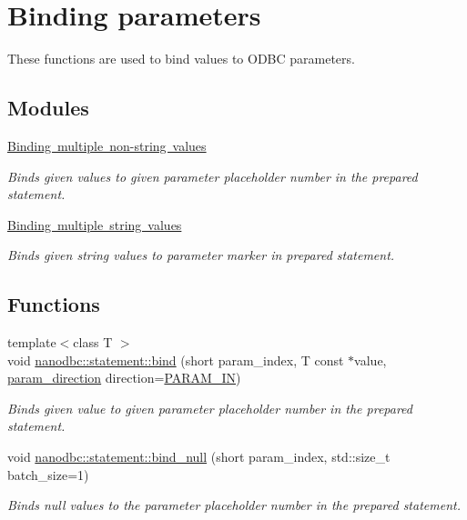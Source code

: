 \hypertarget{group__binding}{}\section{Binding parameters}
\label{group__binding}


These functions are used to bind values to O\+D\+BC parameters.  


\subsection*{Modules}
\begin{DoxyCompactItemize}
\item 
\mbox{\hyperlink{group__bind__multi}{Binding multiple non-\/string values}}
\begin{DoxyCompactList}\small\item\em Binds given values to given parameter placeholder number in the prepared statement. \end{DoxyCompactList}\item 
\mbox{\hyperlink{group__bind__strings}{Binding multiple string values}}
\begin{DoxyCompactList}\small\item\em Binds given string values to parameter marker in prepared statement. \end{DoxyCompactList}\end{DoxyCompactItemize}
\subsection*{Functions}
\begin{DoxyCompactItemize}
\item 
{\footnotesize template$<$class T $>$ }\\void \mbox{\hyperlink{group__binding_gabe1b3e2f93e5b854f6f6a3dfa3250f5c}{nanodbc\+::statement\+::bind}} (short param\+\_\+index, T const $\ast$value, \mbox{\hyperlink{classnanodbc_1_1statement_a523142f53cbbee8d68a074da993e7fa6}{param\+\_\+direction}} direction=\mbox{\hyperlink{classnanodbc_1_1statement_a523142f53cbbee8d68a074da993e7fa6ae33f42ce0677d00c291ff4d8e39f99de}{P\+A\+R\+A\+M\+\_\+\+IN}})
\begin{DoxyCompactList}\small\item\em Binds given value to given parameter placeholder number in the prepared statement. \end{DoxyCompactList}\item 
void \mbox{\hyperlink{group__binding_ga1c92f0059d16d859355f61a020e78d13}{nanodbc\+::statement\+::bind\+\_\+null}} (short param\+\_\+index, std\+::size\+\_\+t batch\+\_\+size=1)
\begin{DoxyCompactList}\small\item\em Binds null values to the parameter placeholder number in the prepared statement. \end{DoxyCompactList}\end{DoxyCompactItemize}


